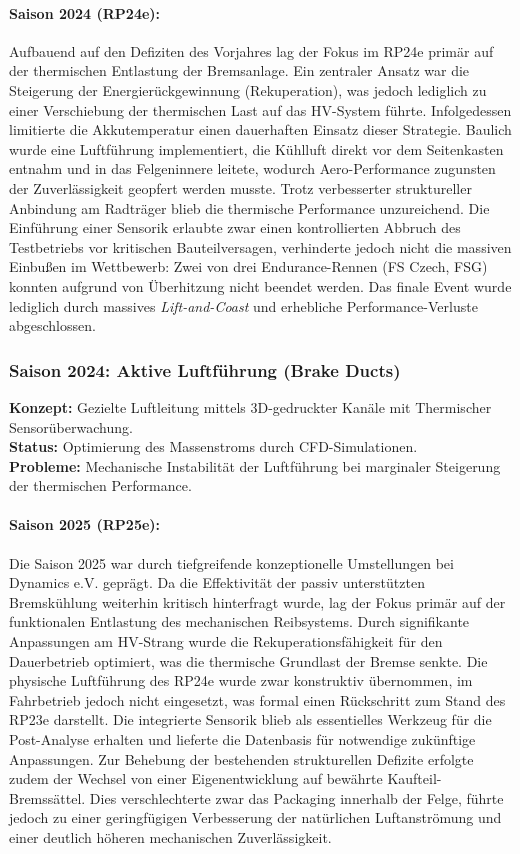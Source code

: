 \paragraph{Saison 2024 (RP24e):} 
Aufbauend auf den Defiziten des Vorjahres lag der Fokus im RP24e primär auf der thermischen Entlastung der Bremsanlage. Ein zentraler Ansatz war die Steigerung der Energierückgewinnung (Rekuperation), was jedoch lediglich zu einer Verschiebung der thermischen Last auf das HV-System führte. Infolgedessen limitierte die Akkutemperatur einen dauerhaften Einsatz dieser Strategie. Baulich wurde eine Luftführung implementiert, die Kühlluft direkt vor dem Seitenkasten entnahm und in das Felgeninnere leitete, wodurch Aero-Performance zugunsten der Zuverlässigkeit geopfert werden musste. Trotz verbesserter struktureller Anbindung am Radträger blieb die thermische Performance unzureichend. Die Einführung einer Sensorik erlaubte zwar einen kontrollierten Abbruch des Testbetriebs vor kritischen Bauteilversagen, verhinderte jedoch nicht die massiven Einbußen im Wettbewerb: Zwei von drei Endurance-Rennen (FS Czech, FSG) konnten aufgrund von Überhitzung nicht beendet werden. Das finale Event wurde lediglich durch massives \textit{Lift-and-Coast} und erhebliche Performance-Verluste abgeschlossen.

\subsubsection{Saison 2024: Aktive Luftführung (Brake Ducts)}
\textbf{Konzept:} Gezielte Luftleitung mittels 3D-gedruckter Kanäle mit Thermischer Sensorüberwachung. \\
\textbf{Status:} Optimierung des Massenstroms durch CFD-Simulationen. \\
\textbf{Probleme:} Mechanische Instabilität der Luftführung bei marginaler Steigerung der thermischen Performance.

\paragraph{Saison 2025 (RP25e):} 
Die Saison 2025 war durch tiefgreifende konzeptionelle Umstellungen bei Dynamics e.V. geprägt. Da die Effektivität der passiv unterstützten Bremskühlung weiterhin kritisch hinterfragt wurde, lag der Fokus primär auf der funktionalen Entlastung des mechanischen Reibsystems. Durch signifikante Anpassungen am HV-Strang wurde die Rekuperationsfähigkeit für den Dauerbetrieb optimiert, was die thermische Grundlast der Bremse senkte. Die physische Luftführung des RP24e wurde zwar konstruktiv übernommen, im Fahrbetrieb jedoch nicht eingesetzt, was formal einen Rückschritt zum Stand des RP23e darstellt. Die integrierte Sensorik blieb als essentielles Werkzeug für die Post-Analyse erhalten und lieferte die Datenbasis für notwendige zukünftige Anpassungen. Zur Behebung der bestehenden strukturellen Defizite erfolgte zudem der Wechsel von einer Eigenentwicklung auf bewährte Kaufteil-Bremssättel. Dies verschlechterte zwar das Packaging innerhalb der Felge, führte jedoch zu einer geringfügigen Verbesserung der natürlichen Luftanströmung und einer deutlich höheren mechanischen Zuverlässigkeit.


